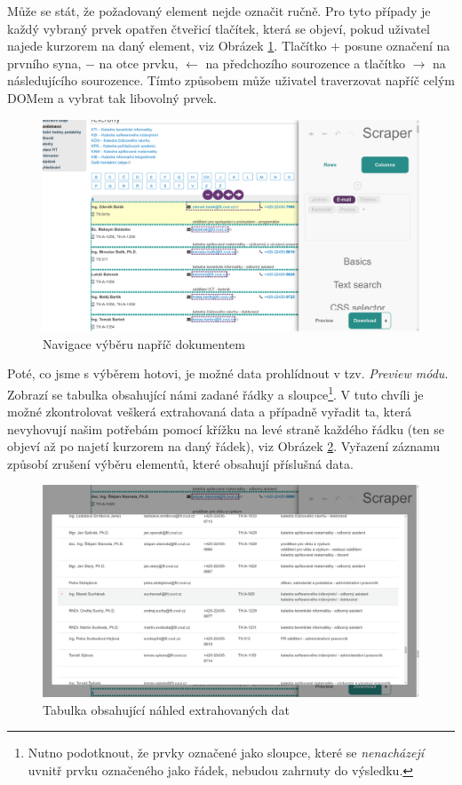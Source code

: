 \documentclass[thesis=B,czech]{FITthesis2}[2012/06/26]
\begin{document}
	Může se stát, že požadovaný element nejde označit ručně. Pro tyto případy je každý vybraný prvek opatřen čtveřicí tlačítek, která se objeví, pokud uživatel najede kurzorem na daný element, viz Obrázek \ref{fig:scraper_dom_navigation}. Tlačítko \textsf{$+$} posune označení na prvního syna, \textsf{$-$} na otce prvku, \textsf{$\leftarrow$} na předchozího sourozence a tlačítko \textsf{$\rightarrow$} na následujícího sourozence. Tímto způsobem může uživatel traverzovat napříč celým DOMem a vybrat tak libovolný prvek.
	\begin{figure}[h]
		\includegraphics[width=\linewidth]{images/Scraper_dom_navigation.png}
		\caption{Navigace výběru napříč dokumentem}
		\label{fig:scraper_dom_navigation}
	\end{figure}

	Poté, co jsme s výběrem hotovi, je možné data prohlídnout v tzv. \textit{Preview módu}. Zobrazí se tabulka obsahující námi zadané řádky a sloupce\footnote{Nutno podotknout, že prvky označené jako sloupce, které se \emph{nenacházejí} uvnitř prvku označeného jako řádek, nebudou zahrnuty do výsledku.}. V tuto chvíli je možné zkontrolovat veškerá extrahovaná data a případně vyřadit ta, která nevyhovují našim potřebám pomocí křížku na levé straně každého řádku (ten se objeví až po najetí kurzorem na daný řádek), viz Obrázek \ref{fig:scraper_preview_mode}. Vyřazení záznamu způsobí zrušení výběru elementů, které obsahují příslušná data.
	\begin{figure}[h]
		\includegraphics[width=\linewidth]{images/Scraper_preview_mode.png}
		\caption{Tabulka obsahující náhled extrahovaných dat}
		\label{fig:scraper_preview_mode}
	\end{figure}
\end{document}
